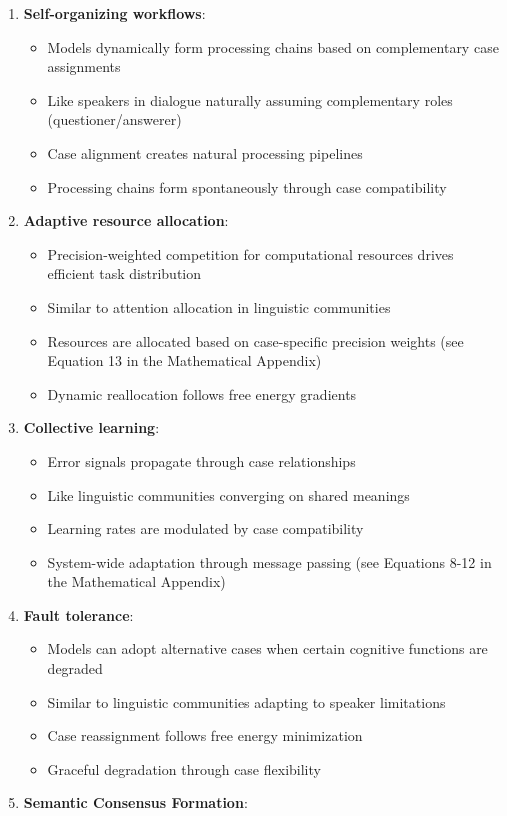 \begin{enumerate}
\def\labelenumi{\arabic{enumi}.}
\tightlist
\item
  \textbf{Self-organizing workflows}:

  \begin{itemize}
  \tightlist
  \item
    Models dynamically form processing chains based on complementary
    case assignments
  \item
    Like speakers in dialogue naturally assuming complementary roles
    (questioner/answerer)
  \item
    Case alignment creates natural processing pipelines
  \item
    Processing chains form spontaneously through case compatibility
  \end{itemize}
\item
  \textbf{Adaptive resource allocation}:

  \begin{itemize}
  \tightlist
  \item
    Precision-weighted competition for computational resources drives
    efficient task distribution
  \item
    Similar to attention allocation in linguistic communities
  \item
    Resources are allocated based on case-specific precision weights
    (see Equation 13 in the Mathematical Appendix)
  \item
    Dynamic reallocation follows free energy gradients
  \end{itemize}
\item
  \textbf{Collective learning}:

  \begin{itemize}
  \tightlist
  \item
    Error signals propagate through case relationships
  \item
    Like linguistic communities converging on shared meanings
  \item
    Learning rates are modulated by case compatibility
  \item
    System-wide adaptation through message passing (see Equations 8-12
    in the Mathematical Appendix)
  \end{itemize}
\item
  \textbf{Fault tolerance}:

  \begin{itemize}
  \tightlist
  \item
    Models can adopt alternative cases when certain cognitive functions
    are degraded
  \item
    Similar to linguistic communities adapting to speaker limitations
  \item
    Case reassignment follows free energy minimization
  \item
    Graceful degradation through case flexibility
  \end{itemize}
\item
  \textbf{Semantic Consensus Formation}:


\end{enumerate}
